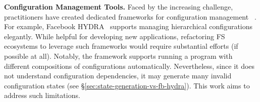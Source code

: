 \smallskip
\noindent
{\bf Configuration Management Tools.} Faced by the increasing  challenge, practitioners have created dedicated frameworks for configuration management 
~\cite{CFEngine,Yadan2019Hydra}. 
For example,  
Facebook HYDRA~\cite{Yadan2019Hydra} supports managing hierarchical configurations elegantly. 
While helpful for developing new applications, refactoring FS ecosystems to leverage such frameworks would require substantial efforts (if possible at all).
Notably, the framework supports running a program with different compositions of configurations automatically. Nevertheless,  since it does not understand configuration dependencies, it may generate many invalid configuration states (see \S\ref{sec:state-generation-vs-fb-hydra}). This work aims to address such limitations.